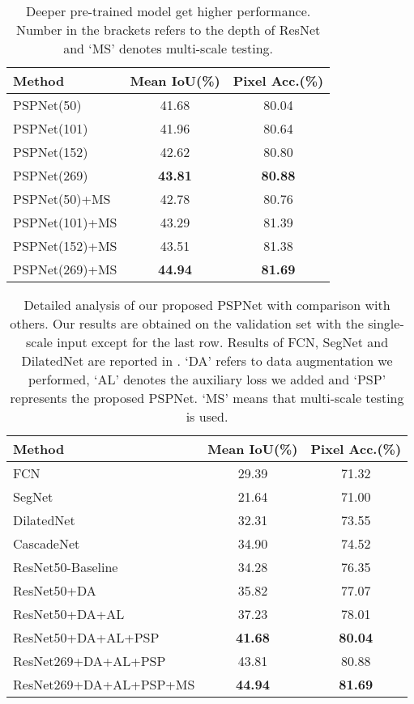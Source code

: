 \documentclass[10pt,twocolumn,letterpaper]{article}
\begin{document}
\begin{table}
\footnotesize
\begin{center}
\begin{tabular}{ l c c}
\hline
Method & Mean IoU(\%) & Pixel Acc.(\%) \\
\hline\hline
PSPNet(50) & 41.68 & 80.04 \\
PSPNet(101) & 41.96 & 80.64 \\
PSPNet(152) & 42.62 & 80.80 \\
PSPNet(269) & \textbf{43.81} & \textbf{80.88} \\
\hline\hline
PSPNet(50)+MS & 42.78 & 80.76 \\
PSPNet(101)+MS & 43.29 & 81.39 \\
PSPNet(152)+MS & 43.51 & 81.38 \\
PSPNet(269)+MS & \textbf{44.94} & \textbf{81.69} \\
\hline
\end{tabular}
\end{center}
\caption{Deeper pre-trained model get higher performance. Number in the brackets refers
to the depth of ResNet and `MS' denotes multi-scale testing.} \label{tab:deepernet}
\end{table}

\begin{table}
\footnotesize
\begin{center}
\begin{tabular}{ l c c}
\hline
Method & Mean IoU(\%) & Pixel Acc.(\%) \\
\hline\hline
FCN \cite{long2015fully} & 29.39 & 71.32 \\
SegNet \cite{badrinarayanan2015segnet} & 21.64 & 71.00 \\
DilatedNet \cite{yu2015multi} & 32.31 & 73.55 \\
CascadeNet \cite{zhou2016semantic} & 34.90 & 74.52 \\
\hline
ResNet50-Baseline & 34.28 & 76.35 \\
ResNet50+DA & 35.82 & 77.07 \\
ResNet50+DA+AL & 37.23 & 78.01 \\
ResNet50+DA+AL+PSP & \textbf{41.68} & \textbf{80.04} \\
\hline
ResNet269+DA+AL+PSP & 43.81 & 80.88 \\
ResNet269+DA+AL+PSP+MS & \textbf{44.94} & \textbf{81.69} \\
\hline
\end{tabular}
\end{center}
\caption{Detailed analysis of our proposed PSPNet with comparison with others. Our
results are obtained on the validation set with the single-scale input except for the
last row. Results of FCN, SegNet and DilatedNet are reported in \cite{zhou2016semantic}.
`DA' refers to data augmentation we performed, `AL' denotes the auxiliary loss we added
and `PSP' represents the proposed PSPNet. `MS' means that multi-scale testing is used.}
\label{tab:baseline}
\end{table}
\end{document}
